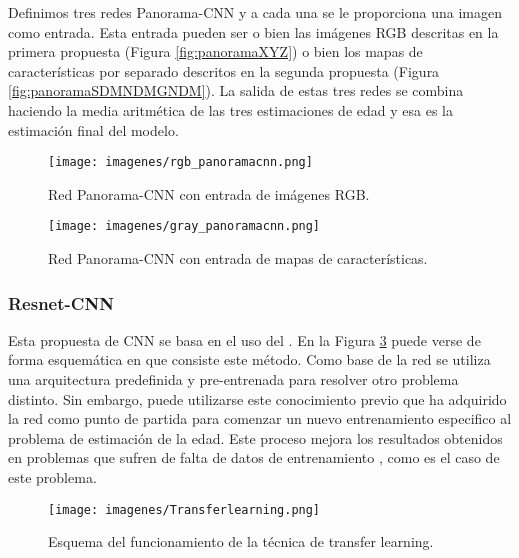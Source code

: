 Definimos tres redes Panorama-CNN y a cada una se le proporciona una imagen como entrada. Esta entrada pueden ser o bien las imágenes RGB descritas en la primera propuesta (Figura \ref{fig:panoramaXYZ}) o bien los mapas de características por separado descritos en la segunda propuesta (Figura \ref{fig:panoramaSDMNDMGNDM}). La salida de estas tres redes se combina haciendo la media aritmética de las tres estimaciones de edad y esa es la estimación final del modelo.\\

\begin{figure}[ht!]
    \centering
    \texttt{[image: imagenes/rgb\_panoramacnn.png]}
    \caption{Red Panorama-CNN con entrada de imágenes RGB.}
    \label{fig:panoramacnnrgb}
\end{figure}

\begin{figure}[ht!]
    \centering
    \texttt{[image: imagenes/gray\_panoramacnn.png]}
    \caption{Red Panorama-CNN con entrada de mapas de características.}
    \label{fig:panoramacnngray}
\end{figure}


\subsubsection{Resnet-CNN}

Esta propuesta de CNN se basa en el uso del . En la Figura \ref{fig:transferlearning} puede verse de forma esquemática en que consiste este método. Como base de la red se utiliza una arquitectura predefinida y pre-entrenada para resolver otro problema distinto. Sin embargo, puede utilizarse este conocimiento previo que ha adquirido la red como punto de partida para comenzar un nuevo entrenamiento especifico al problema de estimación de la edad. Este proceso mejora los resultados obtenidos en problemas que sufren de falta de datos de entrenamiento \cite{tan2018survey}, como es el caso de este problema.\\

\begin{figure}[ht!]
    \centering
    \texttt{[image: imagenes/Transferlearning.png]}
    \caption{Esquema del funcionamiento de la técnica de transfer learning.}
    \label{fig:transferlearning}
\end{figure}\\

